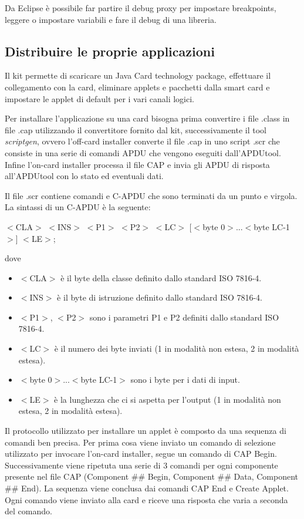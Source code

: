 Da Eclipse è possibile far partire il debug proxy per impostare breakpoints, leggere o impostare variabili e fare il debug di una libreria.

\subsection{Distribuire le proprie applicazioni}
Il kit permette di scaricare un Java Card technology package, effettuare il collegamento con la card, eliminare applets e pacchetti dalla smart card e impostare le applet di default per i vari canali logici.

Per installare l'applicazione su una card bisogna prima convertire i file .class in file .cap utilizzando il convertitore fornito dal kit, successivamente il tool \textit{scriptgen}, ovvero l'off-card installer converte il file .cap in uno script .scr che consiste in una serie di comandi APDU che vengono eseguiti dall'APDUtool. Infine l'on-card installer processa il file CAP e invia gli APDU di risposta all'APDUtool con lo stato ed eventuali dati.

Il file .scr contiene comandi e C-APDU che sono terminati da un punto e virgola.
La sintassi di un C-APDU è la seguente:
\begin{center}
    $<$CLA$>$ $<$INS$>$ $<$P1$>$ $<$P2$>$ $<$LC$>$ [$<$byte 0$>$...$<$byte LC-1$>$] $<$LE$>$;
\end{center}
dove
\begin{itemize}
    \item $<$CLA$>$ è il byte della classe definito dallo standard ISO 7816-4.
    \item $<$INS$>$ è il byte di istruzione definito dallo standard ISO 7816-4.
    \item $<$P1$>$, $<$P2$>$ sono i parametri P1 e P2 definiti dallo standard ISO 7816-4.
    \item $<$LC$>$ è il numero dei byte inviati (1 in modalità non estesa, 2 in modalità estesa).
    \item $<$byte 0$>$...$<$byte LC-1$>$ sono i byte per i dati di input.
    \item $<$LE$>$ è la lunghezza che ci si aspetta per l'output (1 in modalità non estesa, 2 in modalità estesa).
\end{itemize}

Il protocollo utilizzato per installare un applet è composto da una sequenza di comandi ben precisa. Per prima cosa viene inviato un comando di selezione utilizzato per invocare l'on-card installer, segue un comando di CAP Begin. Successivamente viene ripetuta una serie di 3 comandi per ogni componente presente nel file CAP (Component \#\# Begin, Component \#\# Data, Component \#\# End). La sequenza viene conclusa dai comandi CAP End e Create Applet. Ogni comando viene inviato alla card e riceve una risposta che varia a seconda del comando.

